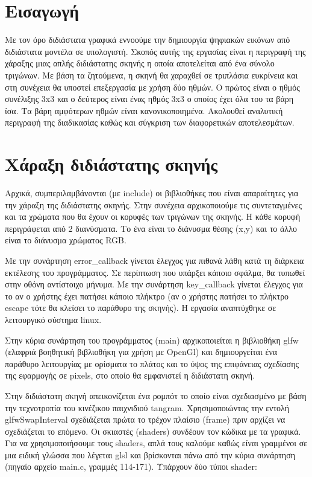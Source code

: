 \documentclass[12pt]{article}
\begin{document}
\section{Εισαγωγή}
Με τον όρο διδιάστατα γραφικά εννοούμε την δημιουργία ψηφιακών εικόνων από διδιάστατα μοντέλα σε υπολογιστή. Σκοπός αυτής της εργασίας είναι η περιγραφή της χάραξης μιας απλής διδιάστατης σκηνής η οποία αποτελείται από ένα σύνολο τριγώνων. Με βάση τα ζητούμενα, η σκηνή θα χαραχθεί σε τριπλάσια ευκρίνεια και στη συνέχεια θα υποστεί επεξεργασία με χρήση δύο ηθμών. Ο πρώτος είναι ο ηθμός συνέλιξης 3x3 και ο δεύτερος είναι ένας ηθμός 3x3 ο οποίος έχει όλα του τα βάρη ίσα. Τα βάρη αμφότερων ηθμών είναι κανονικοποιημένα. Ακολουθεί αναλυτική περιγραφή της διαδικασίας καθώς και σύγκριση των διαφορετικών αποτελεσμάτων.

\section{Χάραξη διδιάστατης σκηνής}
Αρχικά, συμπεριλαμβάνονται (με include) οι βιβλιοθήκες που είναι απαραίτητες για την χάραξη της διδιάστατης σκηνής. Στην συνέχεια αρχικοποιούμε τις συντεταγμένες και τα χρώματα που θα έχουν οι κορυφές των τριγώνων της σκηνής. Η κάθε κορυφή περιγράφεται από 2 διανύσματα. Το ένα είναι το διάνυσμα θέσης (x,y) και το άλλο είναι το διάνυσμα χρώματος \gls{RGB}.

Με την συνάρτηση error\_callback γίνεται έλεγχος για πιθανά λάθη κατά τη διάρκεια εκτέλεσης του προγράμματος. Σε περίπτωση που υπάρξει κάποιο σφάλμα, θα τυπωθεί στην οθόνη αντίστοιχο μήνυμα. Με την συνάρτηση key\_callback γίνεται έλεγχος για το αν ο χρήστης έχει πατήσει κάποιο πλήκτρο (αν ο χρήστης πατήσει το πλήκτρο escape τότε θα κλείσει το παράθυρο της σκηνής). Η εργασία αναπτύχθηκε σε λειτουργικό σύστημα linux.

Στην κύρια συνάρτηση του προγράμματος (main) αρχικοποιείται η βιβλιοθήκη glfw (ελαφριά βοηθητική βιβλιοθήκη για χρήση με OpenGl) και δημιουργείται ένα παράθυρο λειτουργίας με ορίσματα το πλάτος και το ύψος της επιφάνειας σχεδίασης της εφαρμογής σε pixels, στο οποίο θα εμφανιστεί η διδιάστατη σκηνή. 

Στην διδιάστατη σκηνή απεικονίζεται ένα ρομπότ το οποίο είναι σχεδιασμένο με βάση την τεχνοτροπία του κινέζικου παιχνιδιού tangram. Χρησιμοποιώντας την εντολή glfwSwapInterval σχεδιάζεται πρώτα το τρέχον πλαίσιο (frame) πριν αρχίζει να σχεδιάζεται το επόμενο. Οι σκιαστές (shaders) συνδέουν τον κώδικα με τα γραφικά. Για να χρησιμοποιήσουμε τους shaders, απλά τους καλούμε καθώς είναι γραμμένοι σε μια ειδική γλώσσα που λέγεται \gls{glsl} και βρίσκονται πάνω από την κύρια συνάρτηση (πηγαίο αρχείο main.c, γραμμές 114-171). Υπάρχουν δύο τύποι shader: 
\end{document}
